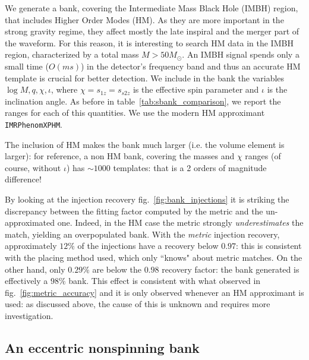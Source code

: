 \documentclass[twocolumn,showpacs,preprintnumbers,nofootinbib,prd,
superscriptaddress,10pt]{revtex4-2}
\begin{document}
We generate a bank, covering the Intermediate Mass Black Hole (IMBH) region, that includes Higher Order Modes (HM). As they are more important in the strong gravity regime, they affect mostly the late inspiral and the merger part of the waveform.
For this reason, it is interesting to search HM data in the IMBH region, characterized by a total mass $M>50 M_\odot$. An IMBH signal spends only a small time ($O(ms)$) in the detector's frequency band and thus an accurate HM template is crucial for better detection.
We include in the bank the variables $\log M, q, \chi, \iota$, where $\chi=s_{1z}=s_{s2z}$ is the effective spin parameter and $\iota$ is the inclination angle.
As before in table~\ref{tab:sbank_comparison}, we report the ranges for each of this quantities. We use the modern HM approximant \texttt{IMRPhenomXPHM}.

The inclusion of HM makes the bank much larger (i.e. the volume element is larger): for reference, a non HM bank, covering the masses and $\chi$ ranges (of course, without $\iota$) has $\sim 1000$ templates: that is a 2 orders of magnitude difference!

By looking at the injection recovery fig.~\ref{fig:bank_injections} it is striking the discrepancy between the fitting factor computed by the metric and the un-approximated one. Indeed, in the HM case the metric strongly {\it underestimates} the match, yielding an overpopulated bank. With the {\it metric} injection recovery, approximately $12\%$ of the injections have a recovery below $0.97$: this is consistent with the placing method used, which only ``knows" about metric matches. On the other hand, only $0.29\%$ are below the $0.98$ recovery factor: the bank generated is effectively a $98\%$ bank.
This effect is consistent with what observed in fig.~\ref{fig:metric_accuracy} and it is only observed whenever an HM approximant is used: as discussed above, the cause of this is unknown and requires more investigation.

\subsection{An eccentric nonspinning bank}\label{sec:eccentric_bank}
\end{document}

